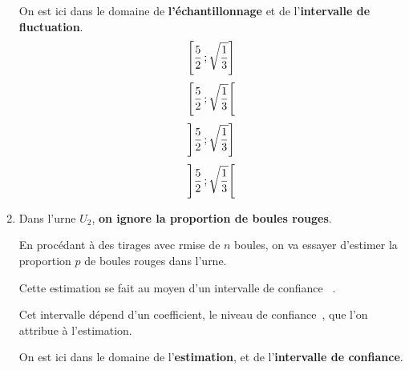 \begin{spacing}{1.2}
\begin{enumerate}
On est ici dans le domaine de \textbf{l'échantillonnage} et de l'\textbf{intervalle de fluctuation}.
\[\left[\dfrac{5}{2}\,;\sqrt{\dfrac{1}{3}}\right]\]
\[\left[\dfrac{5}{2}\,;\sqrt{\dfrac{1}{3}}\right[\]
\[\left]\dfrac{5}{2}\,;\sqrt{\dfrac{1}{3}}\right]\]
\[\left]\dfrac{5}{2}\,;\sqrt{\dfrac{1}{3}}\right[\]

\begin{center}
\end{center}

\item Dans l'urne $U_2$, \textbf{on ignore la proportion de boules rouges}.

En procédant à des tirages avec rmise de $n$ boules, on va essayer d'estimer la proportion $p$ de boules rouges dans l'urne.

Cette estimation se fait au moyen d'un \og intervalle de confiance \fg~.

Cet intervalle dépend d'un coefficient, le \og niveau de confiance\fg~, que l'on attribue à l'estimation.

On est ici dans le domaine de l'\textbf{estimation}, et de l'\textbf{intervalle de confiance}.


\end{enumerate}
\end{spacing}
